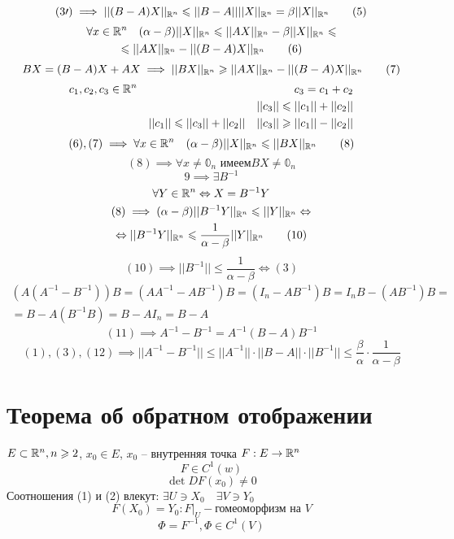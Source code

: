 \documentclass[main]{subfiles}
\begin{document}
    \begin{longProof}
      \[  (3\prime) \implies ||(B-A)X||_{\mathbb{R}^n} \leqslant ||B-A|| ||X||_{\mathbb{R}^n} = \beta||X||_{\mathbb{R}^n} \tag{5} \]
      \begin{multline*}
         \forall x \in \mathbb{R}^n \quad (\alpha-\beta) ||X||_{\mathbb{R}^n} \leqslant  ||AX||_{\mathbb{R}^n} - \beta||X||_{\mathbb{R}^n} \leqslant \\
         \leqslant ||AX||_{\mathbb{R}^n} - ||(B-A)X||_{\mathbb{R}^n} \tag{6} 
      \end{multline*}
      \[ BX = (B-A)X + AX \implies ||BX||_{\mathbb{R}^n} \geqslant ||AX||_{\mathbb{R}^n} - ||(B-A)X||_{\mathbb{R}^n} \tag{7} \]
      \begin{align*}
         c_1, c_2, c_3 \in \mathbb{R}^n && c_3 = c_1 + c_2 \\
        && ||c_3|| \leqslant ||c_1|| + ||c_2|| \\
         && ||c_1|| \leqslant ||c_3|| + ||c_2|| \quad ||c_3|| \geqslant ||c_1|| - ||c_2||
      \end{align*}
      \[(6), (7) \implies \forall x \in \mathbb{R}^n \quad (\alpha - \beta)||X||_{\mathbb{R}^n} \leqslant ||BX||_{\mathbb{R}^n} \tag{8} \] 
      \[ (8) \implies \forall x \ne \mathbb{0}_n \text{ имеем} BX \ne \mathbb{0}_n \tag{9} \]
      \[ 9 \implies \exists B^{-1} \]
      \[ \forall Y \in \mathbb{R}^n \Leftrightarrow X = B^{-1}Y \]
      \begin{multline*}
         (8) \implies (\alpha - \beta)||B^{-1}Y||_{\mathbb{R}^n} \leqslant ||Y||_{\mathbb{R}^n} \Leftrightarrow \\
         \Leftrightarrow ||B^{-1}Y||_{\mathbb{R}^n} \leqslant \frac{1}{\alpha - \beta} ||Y||_{\mathbb{R}^n} \tag{10} 
      \end{multline*}
      \[ (10) \implies ||B^{-1}|| \leq \frac{1}{\alpha-\beta} \Leftrightarrow (3) \]
      \begin{multline}
         (A(A^{-1}-B^{-1}))B = (AA^{-1} - AB^{-1})B = (I_n - AB^{-1})B = I_nB - (AB^{-1})B = \\
         =B - A(B^{-1}B) = B - AI_n = B - A \tag{11}
      \end{multline}
      \[ (11) \implies A^{-1} - B^{-1} = A^{-1}(B-A)B^{-1} \tag{12} \]
      \[ (1), (3), (12) \implies ||A^{-1} - B^{-1}||  \leq ||A^{-1}|| \cdot ||B-A|| \cdot ||B^{-1}|| \leq
      \frac{\beta}{\alpha} \cdot \frac{1}{\alpha-\beta} \tag{4} \]
    \end{longProof}


\section*{Теорема об обратном отображении}
    $E \subset {\mathbb{R}}^n, n \geqslant 2$, $x_0 \in E$, $x_0 $ -- внутренняя точка
    $F: E \rightarrow {\mathbb{R}}^n$
    \[F \in C^{1}(w) \tag{1}\]
    \[ \det DF(x_0) \ne 0 \tag{2}\]
    Соотношения (1) и (2) влекут: $\exists U \ni X_0 \quad \exists V \ni Y_0$
        \[F(X_0) = Y_0:F|_U - \text{гомеоморфизм на } V  \tag{3} \]
        \[ \Phi = F^{-1}, \Phi \in C^1(V) \tag{4}\]
 
\end{document}
